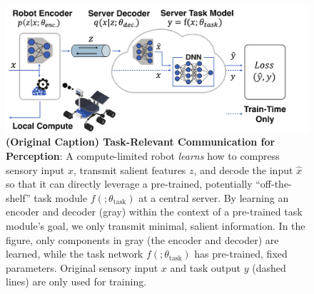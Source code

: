 \begin{figure}[ht]
    \centering
    \includegraphics[width=1.0\columnwidth]{pics/tasknet_block_diagram.pdf}
    \caption{\small{\textbf{(Original Caption) Task-Relevant Communication for Perception}: 
    A compute-limited robot \textit{learns} how to compress sensory input $x$, transmit salient features $z$, and decode the input $\hat{x}$ so that it can directly leverage a pre-trained, potentially ``off-the-shelf'' task module $f(;\theta_{\mathrm{task}})$ at a central server.
    By learning an encoder and decoder (gray) within the context of a pre-trained task module's goal, we only transmit minimal, salient information. In the figure, only components in gray (the encoder and decoder) are learned, while the task network $f(;\theta_{\mathrm{task}})$ has pre-trained, fixed parameters.
Original sensory input $x$ and task output $y$ (dashed lines) are only used for training.} \newline
    \small{}}
    \label{fig:task_autoencoder}
\vspace{-1em}
\end{figure}
